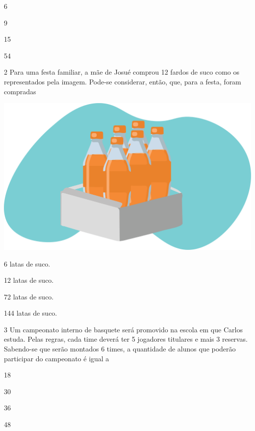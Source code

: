 \begin{escolha}
    \item 6
    \item 9
    \item 15
    \item 54
\end{escolha}


\num{2} Para uma festa familiar, a mãe de Josué comprou 12 fardos de
suco como os representados pela imagem. Pode-se considerar, então, que, para a festa, foram compradas


\begin{minipage}{.5\textwidth}
\includegraphics[width=\textwidth]{./media/image26.png}
\end{minipage}
\begin{minipage}{.5\textwidth}
\begin{escolha}
\item
  6 latas de suco.
\item
  12 latas de suco.
\item
  72 latas de suco.
\item
  144 latas de suco.
\end{escolha}
\end{minipage}

\num{3} Um campeonato interno de basquete será promovido na escola em que Carlos
estuda. Pelas regras, cada time deverá ter 5 jogadores titulares e mais 3 reservas. Sabendo-se que serão montados 6 times, a quantidade de alunos
que poderão participar do campeonato é igual a

\begin{escolha}
\item
  18
\item
  30
\item
  36
\item
  48
\end{escolha}

